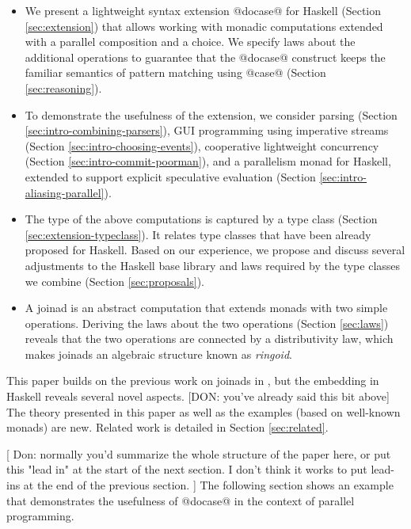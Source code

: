 \documentclass[preprint]{sigplanconf}
\begin{document}
\begin{itemize}
\item We present a lightweight syntax extension @docase@ for Haskell (Section \ref{sec:extension}) 
  that allows working with monadic computations extended with a parallel composition and a choice. 
  We specify laws about the additional operations to guarantee that the @docase@ construct
  keeps the familiar semantics of pattern matching using @case@ (Section \ref{sec:reasoning}).

\item To demonstrate the usefulness of the extension, we consider parsing
  (Section \ref{sec:intro-combining-parsers}), GUI programming using imperative streams
  (Section \ref{sec:intro-choosing-events}), cooperative lightweight concurrency
  (Section \ref{sec:intro-commit-poorman}), and a parallelism monad for Haskell,
  extended to support explicit speculative evaluation (Section \ref{sec:intro-aliasing-parallel}).

\item The type of the above computations is captured by a  type class (Section 
  \ref{sec:extension-typeclass}). It relates type classes that have been already proposed for 
  Haskell. Based on our experience, we propose and discuss several adjustments to the Haskell base 
  library and laws required by the type classes we combine (Section \ref{sec:proposals}). 

\item A joinad is an abstract computation that extends monads with two simple operations.
  Deriving the laws about the two operations (Section \ref{sec:laws}) reveals that the two
  operations are connected by a distributivity law, which makes joinads an algebraic structure
  known as \textit{ringoid}.

\end{itemize}
This paper builds on the previous work on joinads in \fsharp, but the embedding in Haskell 
reveals several novel aspects. [DON: you've already said this bit above] The theory presented in this paper as well as the examples 
(based on well-known monads) are new. Related work is detailed in Section \ref{sec:related}.

[ Don: normally you'd summarize the whole structure of the paper here, or put this "lead in" at the start of the
next section. I don't think it works to put lead-ins at the end of the previous section. ] 
The following section shows an example that demonstrates the usefulness of @docase@ in the context 
of parallel programming.
\end{document}
